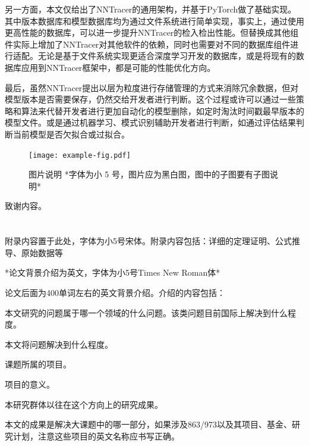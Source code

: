 \documentclass{cjc}
\begin{document}
另一方面，本文仅给出了NNTracer的通用架构，并基于PyTorch做了基础实现。其中版本数据库和模型数据库均为通过文件系统进行简单实现，事实上，通过使用更高性能的数据库，可以进一步提升NNTracer的检入检出性能。但替换成其他组件实际上增加了NNTracer对其他软件的依赖，同时也需要对不同的数据库组件进行适配。无论是基于文件系统实现更适合深度学习开发的数据库，或是将现有的数据库应用到NNTracer框架中，都是可能的性能优化方向。

最后，虽然NNTracer提出以层为粒度进行存储管理的方式来消除冗余数据，但对模型版本是否需要保存，仍然交给开发者进行判断。这个过程或许可以通过一些策略和算法来代替开发者进行更加自动化的模型删除，如定时淘汰时间戳最早版本的模型文件。或是通过机器学习、模式识别辅助开发者进行判断，如通过评估结果判断当前模型是否欠拟合或过拟合。


\begin{figure}[htb]
  \centering
  \texttt{[image: example-fig.pdf]}
  \caption{图片说明 *字体为小 5 号，图片应为黑白图，图中的子图要有子图说明*}
\end{figure}



\begin{acknowledgments}
  致谢内容。
\end{acknowledgments}


\nocite{*}





\newpage

\appendix

\section{}

附录内容置于此处，字体为小5号宋体。附录内容包括：详细的定理证明、公式推导、原始数据等


\makebiographies


\begin{background}
*论文背景介绍为英文，字体为小5号Times New Roman体*

论文后面为400单词左右的英文背景介绍。介绍的内容包括：

本文研究的问题属于哪一个领域的什么问题。该类问题目前国际上解决到什么程度。

本文将问题解决到什么程度。

课题所属的项目。

项目的意义。

本研究群体以往在这个方向上的研究成果。

本文的成果是解决大课题中的哪一部分，如果涉及863/973以及其项目、基金、研究计划，注意这些项目的英文名称应书写正确。
\end{background}
\end{document}

